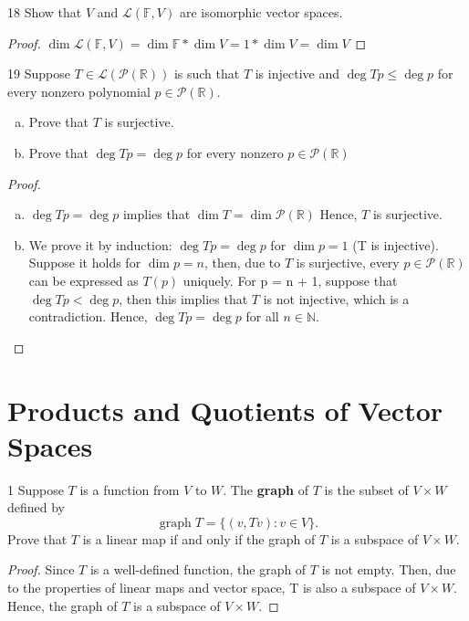 \documentclass{article}
\newenvironment{problem}[1]{\begin{prob*}{#1}{}}{\end{prob*}}
\begin{document}
\begin{problem}{18}
Show that $V$ and $\mathcal{L}(\mathbb{F}, V)$ are isomorphic vector spaces.
\end{problem}
\begin{proof}
$\operatorname{dim} \mathcal{L}(\mathbb{F}, V) = \operatorname{dim} \mathbb{F} * \operatorname{dim}V = 1 * \operatorname{dim} V = \operatorname{dim} V$
\end{proof}

\newpage

\begin{problem}{19}
Suppose $T \in \mathcal{L}(\mathcal{P}(\mathbb{R}))$ is such that $T$ is injective and $\operatorname{deg} Tp \le \operatorname{deg} p$ for every nonzero polynomial $p \in \mathcal{P}(\mathbb{R})$.
\begin{enumerate}[(a)]
\item Prove that $T$ is surjective.
\item Prove that $\operatorname{deg}Tp = \operatorname{deg}p$ for every nonzero $p \in \mathcal{P}(\mathbb{R})$
\end{enumerate}
\end{problem}
\begin{proof}
\begin{enumerate}[(a)]
\item $\operatorname{deg}Tp = \operatorname{deg}p$ implies that $\operatorname{dim} T = \operatorname{dim} \mathcal{P}(\mathbb{R})$
Hence, $T$ is surjective.
\item We prove it by induction: $\operatorname{deg}Tp = \operatorname{deg}p$ for $\operatorname{dim}p = 1$ (T is injective). Suppose it holds for $\operatorname{dim} p = n$, then, due to $T$ is surjective, every  $p \in \mathcal{P}(\mathbb{R})$ can be expressed as $T(p)$ uniquely. For p = n + 1, suppose that $\operatorname{deg}Tp < \operatorname{deg}p$, then this implies that $T$ is not injective, which is a contradiction. Hence, $\operatorname{deg}Tp = \operatorname{deg}p$ for all $n \in \mathbb{N}$.
\end{enumerate}
\end{proof}

\section{Products and Quotients of Vector Spaces}

\begin{problem}{1}
Suppose $T $ is a function from $V $ to $W $. The \textbf{graph} of $T $ is the subset of $V \times W$ defined by \[
	\operatorname{graph} T = \{(v, Tv) : v \in V\}.\]
Prove that $T$ is a linear map if and only if the graph of $T$ is a subspace of $V \times W$.
\end{problem}
\begin{proof}
Since $T$ is a well-defined function, the graph of $T$ is not empty. Then, due to the properties of linear maps and vector space, T is also a subspace of $V \times W$. Hence, the graph of $T$ is a subspace of $V \times W$.
\end{proof}
\end{document}

